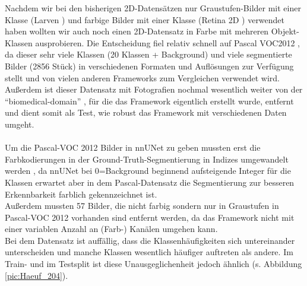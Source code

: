 Nachdem wir bei den bisherigen 2D-Datensätzen nur Graustufen-Bilder mit einer Klasse (Larven \cite{larven}) und farbige Bilder mit einer Klasse (Retina 2D \cite{retina2d}) verwendet haben wollten wir auch noch einen 2D-Datensatz in Farbe mit mehreren Objekt-Klassen ausprobieren. Die Entscheidung fiel relativ schnell auf Pascal VOC2012 \cite{PascalVOCDatensatz}, da dieser sehr viele Klassen (20 Klassen + Background) und viele segmentierte Bilder (2856 Stück) in verschiedenen Formaten und Auflösungen zur Verfügung stellt und von vielen anderen Frameworks zum Vergleichen verwendet wird. Außerdem ist dieser Datensatz mit Fotografien nochmal wesentlich weiter von der \enquote{biomedical-domain} \cite{nnunetGithub2D-Daten}, für die das Framework eigentlich erstellt wurde, entfernt und dient somit als Test, wie robust das Framework mit verschiedenen Daten umgeht.\\\\
Um die Pascal-VOC 2012 Bilder in nnUNet zu geben mussten erst die Farbkodierungen in der Ground-Truth-Segmentierung in Indizes umgewandelt werden \cite{autoMLGithub}, da nnUNet bei 0=Background beginnend aufsteigende Integer für die Klassen erwartet aber in dem Pascal-Datensatz \cite{PascalVOCDatensatz} die Segmentierung zur besseren Erkennbarkeit farblich gekennzeichnet ist.\\
Außerdem mussten 57 Bilder, die nicht farbig sondern nur in Graustufen in Pascal-VOC 2012 \cite{PascalVOCDatensatz} vorhanden sind entfernt werden, da das Framework nicht mit einer variablen Anzahl an (Farb-) Kanälen umgehen kann.\\
Bei dem Datensatz ist auffällig, dass die Klassenhäufigkeiten sich untereinander unterscheiden und manche Klassen wesentlich häufiger auftreten als andere. Im Train- und im Testsplit ist diese Unausgeglichenheit jedoch ähnlich (s. Abbildung \ref{pic:Haeuf_204}).

